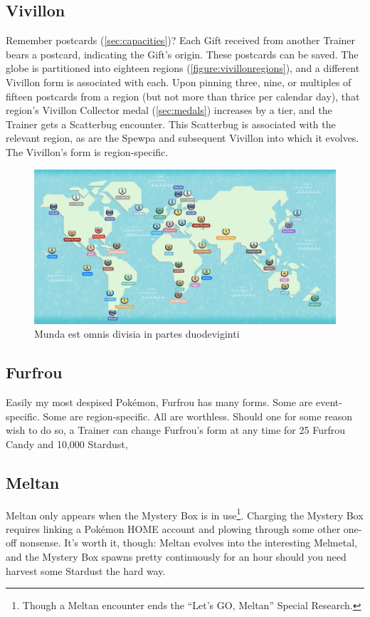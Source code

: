 \subsection{Vivillon}
\label{subsec:vivillon}
Remember postcards (\autoref{sec:capacities})?
Each Gift received from another Trainer bears a postcard, indicating the Gift's origin.
These postcards can be saved.
The globe is partitioned into eighteen regions (\autoref{figure:vivillonregions}),
  and a different Vivillon form is associated with each.
Upon pinning three, nine, or multiples of fifteen postcards from a region (but not more than thrice per calendar day),
  that region's Vivillon Collector medal (\autoref{sec:medals}) increases
  by a tier, and the Trainer gets a Scatterbug encounter.
This Scatterbug is associated with the relevant region, as are the
  Spewpa and subsequent Vivillon into which it evolves.
The Vivillon's form is region-specific.
\begin{figure}[hb]
\centering
\includegraphics[keepaspectratio,width=\textwidth]{images/vivillonregions.png}
\caption{Munda est omnis divisia in partes duodeviginti}
\label{figure:vivillonregions}
\end{figure}

\subsection{Furfrou}
\label{subsec:furfrou}
Easily my most despised Pokémon, Furfrou has many forms.
Some are event-specific.
Some are region-specific.
All are worthless.
Should one for some reason wish to do so, a Trainer can change Furfrou's form
  at any time for 25 Furfrou Candy and 10,000 Stardust,

\subsection{Meltan}
\label{subsec:meltan}
Meltan only appears when the Mystery Box is in use\footnote{Though a Meltan encounter ends the ``Let's GO, Meltan'' Special Research.}.
Charging the Mystery Box requires linking a Pokémon HOME account and plowing through
  some other one-off nonsense.
It's worth it, though: Meltan evolves into the interesting Melmetal, and the Mystery
  Box spawns pretty continuously for an hour should you need harvest some Stardust
  the hard way.

